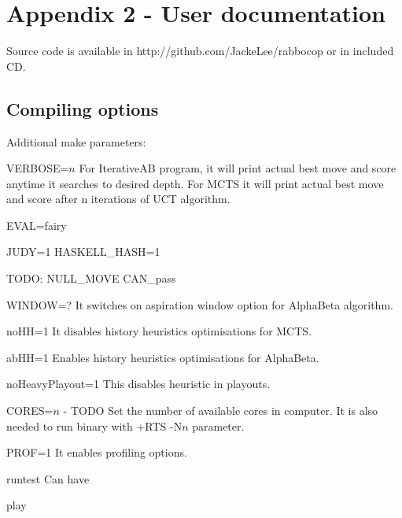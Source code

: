 
\chapter{Appendix 2 - User documentation}
Source code is available in http://github.com/JackeLee/rabbocop or in included CD.

\section{Compiling options}
Additional make parameters:

VERBOSE=$n$
  For IterativeAB program, it will print actual best move and score anytime
  it searches to desired depth.
  For MCTS it will print actual best move and score after n iterations of
  UCT algorithm.

EVAL=fairy

JUDY=1
HASKELL\_HASH=1

TODO: NULL\_MOVE CAN\_pass

WINDOW=?
	It switches on aspiration window option for AlphaBeta algorithm.

noHH=1
	It disables history heuristics optimisations for MCTS.

abHH=1
	Enables history heuristics optimisations for AlphaBeta.

noHeavyPlayout=1
	This disables heuristic in playouts.

CORES=$n$ - TODO
	Set the number of available cores in computer. It is also needed to run
	binary with +RTS -N$n$ parameter.

PROF=1
	It enables profiling options.

runtest
	Can have

play
